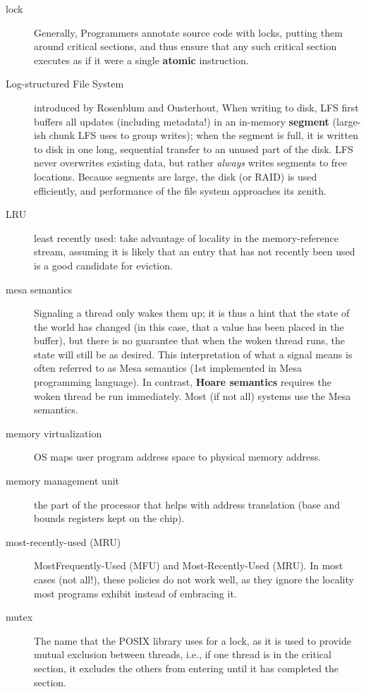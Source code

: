 \begin{description}
\item[lock] Generally, Programmers annotate source code with locks, putting them around critical sections, and thus ensure that any such critical section executes as if it were a single \textbf{atomic} instruction.

\item[Log-structured File System] introduced by Rosenblum and Ousterhout, When writing to disk, LFS first buffers all updates (including metadata!) in an in-memory \textbf{segment} (large-ish chunk LFS uses to group writes); when the segment is full, it is written to disk in one long, sequential transfer to an unused part of the disk. LFS never overwrites existing data, but rather \emph{always} writes segments to free locations. Because segments are large, the disk (or RAID) is used efficiently, and performance of the file system approaches its zenith.

\item[LRU] least recently used: take advantage of locality in the memory-reference stream, assuming it is likely that an entry that has not recently been used is a good
candidate for eviction.

\item[mesa semantics] Signaling a thread only wakes them up; it is thus a hint that the state of the world has changed (in this case, that a value has been placed in the buffer), but there is no guarantee that when the woken thread runs, the state will still be as desired. This interpretation of what a signal means is often referred to as Mesa semantics (1st implemented in Mesa programming language). In contrast, \textbf{Hoare semantics} requires the woken thread be run immediately.  Most (if not all) systems use the Mesa semantics.

\item[memory virtualization] OS maps user program address space to physical memory address.

\item[memory management unit] the part of the processor that helps with address translation (base and bounds registers kept on the chip).

\item[most-recently-used (MRU)] MostFrequently-Used (MFU) and Most-Recently-Used (MRU). In most cases (not all!), these policies do not work well, as they ignore the locality most programs exhibit instead of embracing it.

\item[mutex] The name that the POSIX library uses for a lock, as it is used to provide mutual exclusion between threads, i.e., if one thread is in the critical section, it excludes the others from entering until it has completed the section.


\end{description}
